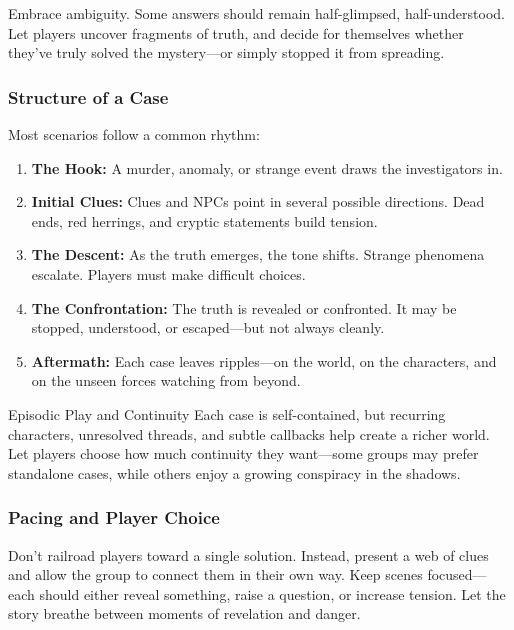 Embrace ambiguity. Some answers should remain half-glimpsed, half-understood. Let players uncover fragments of truth, and decide for themselves whether they’ve truly solved the mystery—or simply stopped it from spreading.

\subsubsection*{Structure of a Case}

Most scenarios follow a common rhythm:

\begin{enumerate}
    \item \textbf{The Hook:} A murder, anomaly, or strange event draws the investigators in.
    \item \textbf{Initial Clues:} Clues and NPCs point in several possible directions. Dead ends, red herrings, and cryptic statements build tension.
    \item \textbf{The Descent:} As the truth emerges, the tone shifts. Strange phenomena escalate. Players must make difficult choices.
    \item \textbf{The Confrontation:} The truth is revealed or confronted. It may be stopped, understood, or escaped—but not always cleanly.
    \item \textbf{Aftermath:} Each case leaves ripples—on the world, on the characters, and on the unseen forces watching from beyond.
\end{enumerate}

\begin{CommentBox}{Episodic Play and Continuity}
    Each case is self-contained, but recurring characters, unresolved threads, and subtle callbacks help create a richer world. Let players choose how much continuity they want—some groups may prefer standalone cases, while others enjoy a growing conspiracy in the shadows.
\end{CommentBox}

\subsubsection*{Pacing and Player Choice}

Don’t railroad players toward a single solution. Instead, present a web of clues and allow the group to connect them in their own way. Keep scenes focused—each should either reveal something, raise a question, or increase tension. Let the story breathe between moments of revelation and danger.

